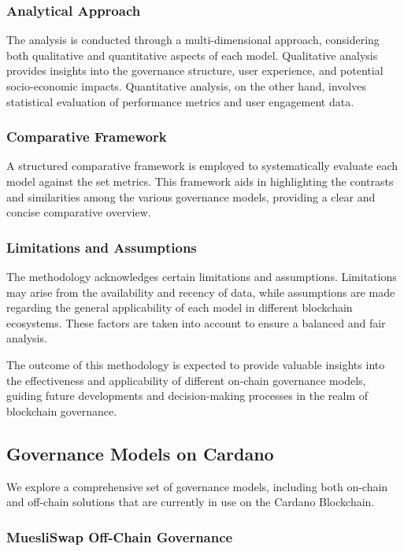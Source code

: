 \documentclass[11pt]{article}
\begin{document}
\subsubsection{Analytical Approach}
The analysis is conducted through a multi-dimensional approach, considering both qualitative and quantitative aspects of each model. Qualitative analysis provides insights into the governance structure, user experience, and potential socio-economic impacts. Quantitative analysis, on the other hand, involves statistical evaluation of performance metrics and user engagement data.

\subsubsection{Comparative Framework}
A structured comparative framework is employed to systematically evaluate each model against the set metrics. This framework aids in highlighting the contrasts and similarities among the various governance models, providing a clear and concise comparative overview.

\subsubsection{Limitations and Assumptions}
The methodology acknowledges certain limitations and assumptions. Limitations may arise from the availability and recency of data, while assumptions are made regarding the general applicability of each model in different blockchain ecosystems. These factors are taken into account to ensure a balanced and fair analysis.

The outcome of this methodology is expected to provide valuable insights into the effectiveness and applicability of different on-chain governance models, guiding future developments and decision-making processes in the realm of blockchain governance.

\subsection{Governance Models on Cardano}

We explore a comprehensive set of governance models, including both on-chain and off-chain solutions
that are currently in use on the Cardano Blockchain.

\subsubsection{MuesliSwap Off-Chain Governance}
\end{document}
